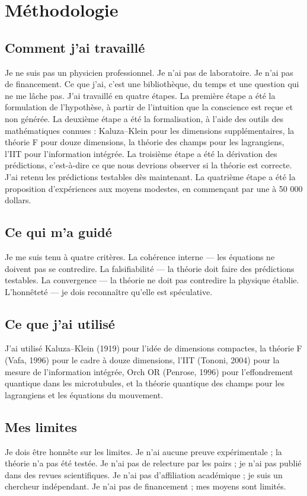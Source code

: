 \documentclass[11pt,a4paper]{article}
\begin{document}
\section{Méthodologie}
\subsection{Comment j'ai travaillé}
Je ne suis pas un physicien professionnel. Je n'ai pas de laboratoire. Je n'ai pas de financement. Ce que j'ai, c'est une bibliothèque, du temps et une question qui ne me lâche pas. J'ai travaillé en quatre étapes. La première étape a été la formulation de l'hypothèse, à partir de l'intuition que la conscience est reçue et non générée. La deuxième étape a été la formalisation, à l'aide des outils des mathématiques connues : Kaluza--Klein pour les dimensions supplémentaires, la théorie F pour douze dimensions, la théorie des champs pour les lagrangiens, l'IIT pour l'information intégrée. La troisième étape a été la dérivation des prédictions, c'est-à-dire ce que nous devrions observer si la théorie est correcte. J'ai retenu les prédictions testables dès maintenant. La quatrième étape a été la proposition d'expériences aux moyens modestes, en commençant par une à 50 000 dollars.

\subsection{Ce qui m'a guidé}
Je me suis tenu à quatre critères. La cohérence interne --- les équations ne doivent pas se contredire. La falsifiabilité --- la théorie doit faire des prédictions testables. La convergence --- la théorie ne doit pas contredire la physique établie. L'honnêteté --- je dois reconnaître qu'elle est spéculative.

\subsection{Ce que j'ai utilisé}
J'ai utilisé Kaluza--Klein (1919) pour l'idée de dimensions compactes, la théorie F (Vafa, 1996) pour le cadre à douze dimensions, l'IIT (Tononi, 2004) pour la mesure de l'information intégrée, Orch OR (Penrose, 1996) pour l'effondrement quantique dans les microtubules, et la théorie quantique des champs pour les lagrangiens et les équations du mouvement.

\subsection{Mes limites}
Je dois être honnête sur les limites. Je n'ai aucune preuve expérimentale ; la théorie n'a pas été testée. Je n'ai pas de relecture par les pairs ; je n'ai pas publié dans des revues scientifiques. Je n'ai pas d'affiliation académique ; je suis un chercheur indépendant. Je n'ai pas de financement ; mes moyens sont limités.
\end{document}
